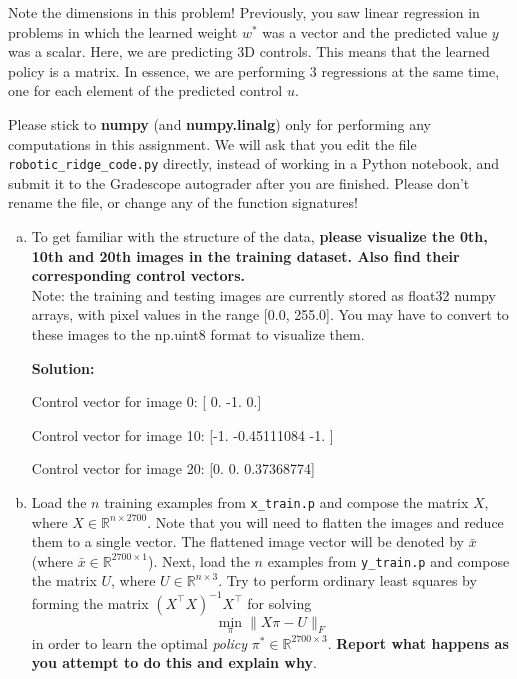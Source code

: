 \documentclass{article}
\newenvironment{solution}{\color{blue} \smallskip \textbf{Solution:}}{}
\begin{document}
Note the dimensions in this problem! Previously, you saw linear regression in problems in which the learned weight $w^*$ was a vector and the predicted value $y$ was a scalar. Here, we are predicting 3D controls. This means that the learned policy is a matrix. In essence, we are performing $3$ regressions at the same time, one for each element of the predicted control $u$. 

Please stick to {\bf numpy} (and {\bf numpy.linalg}) only for performing any computations in this assignment. We will ask that you edit the file \texttt{robotic\_ridge\_code.py} directly, instead of working in a Python notebook, and submit it to the Gradescope autograder after you are finished. Please don't rename the file, or change any of the function signatures!

\begin{enumerate}[(a)]
    \item To get familiar with the structure of the data, \textbf{please visualize the 0th, 10th and 20th images in the training dataset. Also find their corresponding control vectors.} \\
    Note: the training and testing images are currently stored as float32 numpy arrays, with pixel values in the range [0.0, 255.0]. You may have to convert to these images to the np.uint8 format to visualize them.

    \begin{solution}
    
    
Control vector for image 0: [ 0. -1.  0.]


Control vector for image 10: [-1.         -0.45111084 -1.        ]


Control vector for image 20: [0.         0.         0.37368774]
    \end{solution}

    \newpage
    \item Load the $n$ training examples from \texttt{x\_train.p} and compose the matrix $X$, where $X \in \mathbb{R}^{n\times 2700}$. Note that you will need to flatten the images and reduce them to a single vector. The flattened image vector will be denoted by $\bar{x}$ (where $\bar{x} \in \mathbb{R}^{2700\times 1}$). Next, load the $n$ examples from \texttt{y\_train.p} and compose the matrix $U$, where $U \in \mathbb{R}^{n\times 3}$. Try to perform ordinary least squares by forming the matrix $(X^\top X)^{-1}X^\top$ for solving
    \[\min_{\pi} \|X\pi-U \|_F\]
    in order to learn the optimal \emph{policy} $\pi^* \in \mathbb{R}^{2700 \times 3}$. \textbf{Report what happens as you attempt to do this and explain why}.


\end{enumerate}
\end{document}
